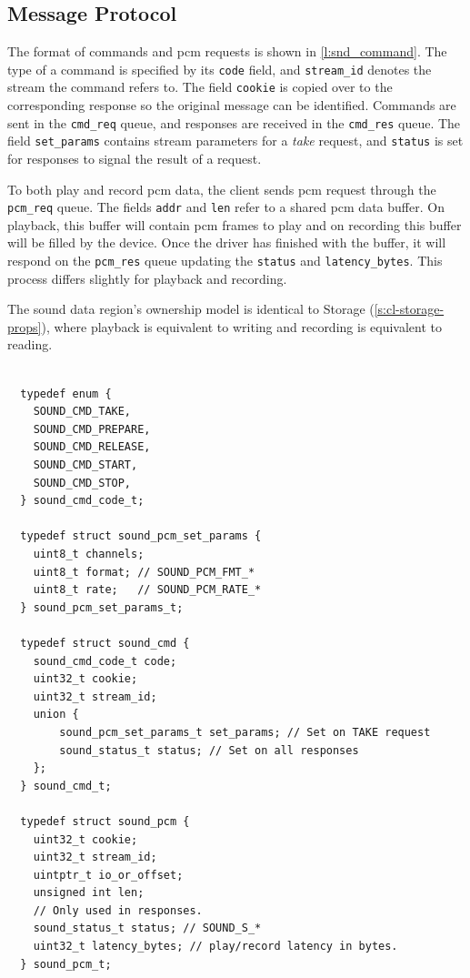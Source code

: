 \documentclass[a4paper,12pt]{report}
\newcommand{\code}[1]{\texttt{#1}}
\begin{document}
\subsection{Message Protocol}

The format of commands and \gls{pcm} requests is shown in \autoref{l:snd_command}.
The type of a command is specified by its \code{code} field, and
\code{stream\_id} denotes the stream the command refers to. The field
\code{cookie} is copied over to the corresponding response so the original
message can be identified. Commands are sent in the \code{cmd\_req} queue, and
responses are received in the \code{cmd\_res} queue.  The field \code{set\_params}
contains stream parameters for a \textit{take} request, and \code{status} is set
for responses to signal the result of a request.

To both play and record \gls{pcm} data, the client sends \gls{pcm} request through the
\code{pcm\_req} queue. The fields \code{addr} and \code{len} refer to a shared
\gls{pcm} data buffer. On playback, this buffer will contain \gls{pcm} frames to play and
on recording this buffer will be filled by the device. Once the driver has
finished with the buffer, it will respond on the \code{pcm\_res} queue updating
the \code{status} and \code{latency\_bytes}. This process differs slightly for
playback and recording.

The sound data region's ownership model is identical to Storage
(\autoref{s:cl-storage-props}), where playback is equivalent to writing and
recording is equivalent to reading.

\begin{lstlisting}[gobble=2,firstline=2,float=th,
  label={l:snd_command},
  caption={Sound definitions}]

  typedef enum {
    SOUND_CMD_TAKE,
    SOUND_CMD_PREPARE,
    SOUND_CMD_RELEASE,
    SOUND_CMD_START,
    SOUND_CMD_STOP,
  } sound_cmd_code_t;

  typedef struct sound_pcm_set_params {
    uint8_t channels;
    uint8_t format; // SOUND_PCM_FMT_*
    uint8_t rate;   // SOUND_PCM_RATE_*
  } sound_pcm_set_params_t;

  typedef struct sound_cmd {
    sound_cmd_code_t code;
    uint32_t cookie;
    uint32_t stream_id;
    union {
        sound_pcm_set_params_t set_params; // Set on TAKE request
        sound_status_t status; // Set on all responses
    };
  } sound_cmd_t;

  typedef struct sound_pcm {
    uint32_t cookie;
    uint32_t stream_id;
    uintptr_t io_or_offset;
    unsigned int len;
    // Only used in responses.
    sound_status_t status; // SOUND_S_*
    uint32_t latency_bytes; // play/record latency in bytes.
  } sound_pcm_t;
\end{lstlisting}
\end{document}

